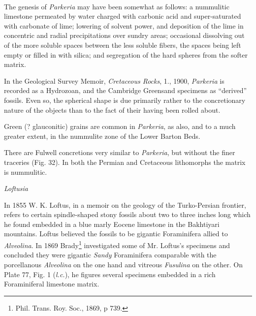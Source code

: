 \documentclass[a4paper, 12pt, oneside, landscape]{article}
\begin{document}
\paragraph{}
The genesis of \emph{Parkeria} may have been somewhat as follows: a nummulitic limestone permeated by water charged with carbonic acid and super-saturated with carbonate of lime; lowering of solvent power, and deposition of the lime in concentric and radial precipitations over sundry areas; occasional dissolving out of the more soluble spaces between the less soluble fibers, the spaces being left empty or filled in with silica; and segregation of the hard spheres from the softer matrix.

In the Geological Survey Memoir, \emph{Cretaceous Rocks}, 1., 1900, \emph{Parkeria} is recorded as a Hydrozoan, and the Cambridge Greensand specimens as ``derived'' fossils. Even so, the spherical shape is due primarily rather to the concretionary nature of the objects than to the fact of their having been rolled about.

Green (? glauconitic) grains are common in \emph{Parkeria}, as also, and to a much greater extent, in the nummulite zone of the Lower Barton Beds.

There are Fulwell concretions very similar to \emph{Parkeria}, but without the finer traceries (Fig. 32). In both the Permian and Cretaceous lithomorphs the matrix is nummulitic.

\bigskip
\centerline{\emph{Loftusia}}

In 1855 W. K. Loftus, in a memoir on the geology of the Turko-Persian frontier, refers to certain spindle-shaped stony fossils about two to three inches long which he found embedded in a blue marly Eocene limestone in the Bakhtiyari mountains. Loftus believed the fossils to be gigantic Foraminifera allied to \emph{Alveolina}. In 1869 Brady\footnote{Phil. Trans. Roy. Soc., 1869, p 739.} investigated some of Mr. Loftus's specimens and concluded they were gigantic \emph{Sandy} Foraminifera comparable with the porcellanous \emph{Alveolina} on the one hand and vitreous \emph{Fusulina} on the other. On Plate 77, Fig. 1 (\emph{l.c.}), he figures several specimens embedded in a rich Foraminiferal limestone matrix.
\end{document}
